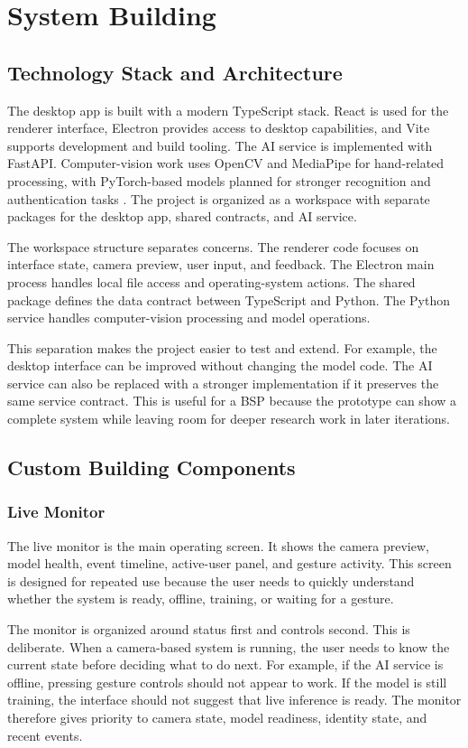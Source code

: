 \documentclass[10pt,twocolumn]{article}
\begin{document}
\section{System Building}
\subsection{Technology Stack and Architecture}
The desktop app is built with a modern TypeScript stack.
React is used for the renderer interface, Electron provides access to desktop capabilities, and Vite supports development and build tooling.
The AI service is implemented with FastAPI.
Computer-vision work uses OpenCV and MediaPipe for hand-related processing, with PyTorch-based models planned for stronger recognition and authentication tasks \cite{bradski2000opencv,zhang2020mediapipe,paszke2019pytorch}.
The project is organized as a workspace with separate packages for the desktop app, shared contracts, and AI service.

The workspace structure separates concerns.
The renderer code focuses on interface state, camera preview, user input, and feedback.
The Electron main process handles local file access and operating-system actions.
The shared package defines the data contract between TypeScript and Python.
The Python service handles computer-vision processing and model operations.

This separation makes the project easier to test and extend.
For example, the desktop interface can be improved without changing the model code.
The AI service can also be replaced with a stronger implementation if it preserves the same service contract.
This is useful for a BSP because the prototype can show a complete system while leaving room for deeper research work in later iterations.

\subsection{Custom Building Components}
\subsubsection{Live Monitor}
The live monitor is the main operating screen.
It shows the camera preview, model health, event timeline, active-user panel, and gesture activity.
This screen is designed for repeated use because the user needs to quickly understand whether the system is ready, offline, training, or waiting for a gesture.

The monitor is organized around status first and controls second.
This is deliberate.
When a camera-based system is running, the user needs to know the current state before deciding what to do next.
For example, if the AI service is offline, pressing gesture controls should not appear to work.
If the model is still training, the interface should not suggest that live inference is ready.
The monitor therefore gives priority to camera state, model readiness, identity state, and recent events.
\end{document}
